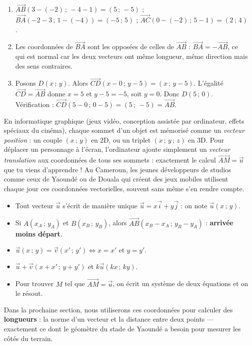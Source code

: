 \documentclass[11pt]{article}
\begin{document}
\begin{corrige}[Exercice 1]
\begin{enumerate}
\item $\overrightarrow{AB}(3-(-2)\,;\,-4-1) = (5\,;\,-5)$ ; $\overrightarrow{BA}(-2-3\,;\,1-(-4)) = (-5\,;\,5)$ ; $\overrightarrow{AC}(0-(-2)\,;\,5-1) = (2\,;\,4)$.
\item Les coordonnées de $\overrightarrow{BA}$ sont les opposées de celles de $\overrightarrow{AB}$ : $\overrightarrow{BA} = -\overrightarrow{AB}$, ce qui est normal car les deux vecteurs ont même longueur, même direction mais des sens contraires.
\item Posons $D(x\,;\,y)$. Alors $\overrightarrow{CD}(x - 0\,;\,y - 5) = (x\,;\,y-5)$. L'égalité $\overrightarrow{CD} = \overrightarrow{AB}$ donne $x = 5$ et $y - 5 = -5$, soit $y = 0$. Donc $D(5\,;\,0)$. Vérification : $\overrightarrow{CD}(5-0\,;\,0-5) = (5\,;\,-5) = \overrightarrow{AB}$. 
\end{enumerate}
\end{corrige}

\begin{savaistu}
En informatique graphique (jeux vidéo, conception assistée par ordinateur, effets spéciaux du cinéma), chaque sommet d'un objet est mémorisé comme un \emph{vecteur position} : un couple $(x\,;\,y)$ en 2D, ou un triplet $(x\,;\,y\,;\,z)$ en 3D. Pour déplacer un personnage à l'écran, l'ordinateur ajoute simplement un \emph{vecteur translation} aux coordonnées de tous ses sommets : exactement le calcul $\overrightarrow{AM} = \vec{u}$ que tu viens d'apprendre ! Au Cameroun, les jeunes développeurs de studios comme ceux de Yaoundé ou de Douala qui créent des jeux mobiles utilisent chaque jour ces coordonnées vectorielles, souvent sans même s'en rendre compte.
\end{savaistu}

\begin{aretenir}
\begin{itemize}
\item Tout vecteur $\vec{u}$ s'écrit de manière unique $\vec{u} = x\vec{i} + y\vec{j}$ : on note $\vec{u}(x\,;\,y)$.
\item Si $A(x_A\,;\,y_A)$ et $B(x_B\,;\,y_B)$, alors $\overrightarrow{AB}(x_B - x_A\,;\,y_B - y_A)$ : \textbf{arrivée moins départ}.
\item $\vec{u}(x\,;\,y) = \vec{v}(x'\,;\,y') \iff x = x'$ et $y = y'$.
\item $\vec{u} + \vec{v}(x+x'\,;\,y+y')$ et $k\vec{u}(kx\,;\,ky)$.
\item Pour trouver $M$ tel que $\overrightarrow{AM} = \vec{u}$, on écrit un système de deux équations et on le résout.
\end{itemize}
Dans la prochaine section, nous utiliserons ces coordonnées pour calculer des \textbf{longueurs} : la norme d'un vecteur et la distance entre deux points — exactement ce dont le géomètre du stade de Yaoundé a besoin pour mesurer les côtés du terrain.
\end{aretenir}
\end{document}
